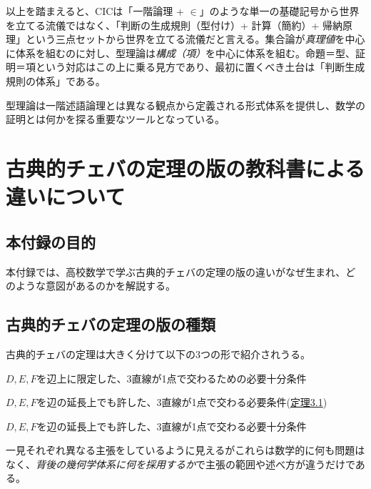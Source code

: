 \documentclass[a4paper,12pt]{bxjsbook}
\newlength{\customindent}
\newenvironment{body}{
  \par
  \begingroup
  \setlength{\leftskip}{\customindent}
  \setlength{\rightskip}{0pt}
  \setlength{\parindent}{1em}
  \setlength{\displayindent}{\customindent}
  \setlength{\displaywidth}{\dimexpr\linewidth-\customindent\relax}
}{
  \par
  \endgroup
}
\theoremstyle{theorem}
\begin{document}
\begin{body}
        \indent 以上を踏まえると、CICは「一階論理 + $\in$」のような単一の基礎記号から世界を立てる流儀ではなく、「判断の生成規則（型付け）+ 計算（簡約）+ 帰納原理」という三点セットから世界を立てる流儀だと言える。集合論が\emph{真理値}を中心に体系を組むのに対し、型理論は\emph{構成（項）}を中心に体系を組む。命題＝型、証明＝項という対応はこの上に乗る見方であり、最初に置くべき土台は「判断生成規則の体系」である。

        \indent 型理論は一階述語論理とは異なる観点から定義される形式体系を提供し、数学の証明とは何かを探る重要なツールとなっている。
    \end{body}

    \chapter{古典的チェバの定理の版の教科書による違いについて}\label{appendix:classical-ceva-version}

    \section{本付録の目的}
    \begin{body}
        \indent 本付録では、高校数学で学ぶ古典的チェバの定理の版の違いがなぜ生まれ、どのような意図があるのかを解説する。
    \end{body}

    \section{古典的チェバの定理の版の種類}
    \begin{body}
        \indent 古典的チェバの定理は大きく分けて以下の3つの形で紹介されうる。
        \begin{bodyitemize}
            \item[①] $D, E, F$を辺上に限定した、3直線が1点で交わるための必要十分条件
            \item[②] $D, E, F$を辺の延長上でも許した、3直線が1点で交わる必要条件(\hyperref[thm:classical-ceva]{定理3.1})
            \item[③] $D, E, F$を辺の延長上でも許した、3直線が1点で交わる必要十分条件
        \end{bodyitemize}

        \indent 一見それぞれ異なる主張をしているように見えるがこれらは数学的に何も問題はなく、\emph{背後の幾何学体系に何を採用するか}で主張の範囲や述べ方が違うだけである。

    \end{body}
\end{document}

